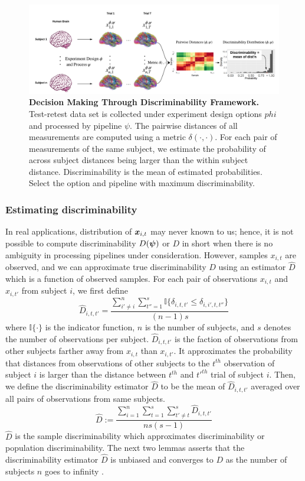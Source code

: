 \documentclass{article}
\begin{document}
\begin{figure}[H]
	\includegraphics[width=\linewidth]{../Figs/flow_chart.png}
	\caption{{\bf Decision Making Through Discriminability Framework.} Test-retest data set is collected under experiment design options $phi$ and processed by pipeline $\psi$. The pairwise distances of all measurements are computed using a metric $\delta(\cdot,\cdot)$. For each pair of measurements of the same subject, we estimate the probability of across subject distances being larger than the within subject distance. Discriminability is the mean of estimated probabilities. Select the option and pipeline with maximum discriminability.}
	\label{fig:fc}
\end{figure}

\subsubsection{Estimating discriminability}
In real applications, distribution of $\boldsymbol{x}_{i,t}$ may never known to us; hence, it is not possible to compute discriminability $D(\boldsymbol{\psi})$ or $D$ in short when there is no ambiguity in processing pipelines under consideration. However, samples $x_{i,t}$ are observed, and we can approximate true discriminability $D$ using an estimator $\hat{D}$ which is a function of observed samples. For each pair of observations $x_{i,t}$ and $x_{i,t'}$ from subject $i$, we first define
\[ \hat{D}_{i,t,t'} = \frac{\sum\limits_{i' \neq i}^{n} \sum\limits_{t''=1}^{s} \mathbb{I}\{\delta_{i,t,t'} \leq \delta_{i,i',t,t''} \} }{(n-1)s}\]
where $\mathbb{I}\{ \cdot \} $ is the indicator function, $n$ is the number of subjects, and $s$ denotes the number of observations per subject. $\hat{D}_{i,t,t'}$ is the faction of observations from other subjects farther away from $x_{i,t}$ than $x_{i,t'}$. It approximates the probability that distances from observations of other subjects to the $t^{th}$ observation of subject $i$ is larger than the distance between $t^{th}$ and $t'^{th}$ trial of subject $i$. Then, we define the discriminability estimator $\hat{D}$ to be the mean of $\hat{D}_{i,t,t'}$ averaged over all pairs of observations from same subjects.
\[ \hat{D} := \frac{\sum\limits_{i=1}^{n} \sum\limits_{t=1}^{s}  \sum\limits_{t' \neq t}^{s} \hat{D}_{i,t,t'}}{ns(s-1)} \]
$\hat{D}$ is the sample discriminability which approximates discriminability or population discriminability. The next two lemmas asserts that the discriminability estimator $\hat{D}$ is unbiased and converges to $D$ as the number of subjects $n$ goes to infinity \cite{bickel2015mathematical}.
\end{document}
